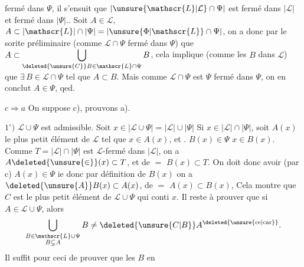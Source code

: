 fermé dans $\Psi$, il s'ensuit que $\lvert\unsure{\mathscr{L}|\mathcal{L}}\cap\Psi\rvert$ est fermé dans $\lvert\mathscr{L}\rvert$ et fermé dans $\lvert\Psi\rvert$.. Soit $A\in\mathscr{L}$, $A\subset\lvert\mathscr{L}\rvert\cap\lvert\Psi\rvert=\lvert\unsure{\Phi|\mathscr{L}}\cap\Psi\rvert$, on a donc par le sorite préliminaire (comme $\mathscr{L}\cap\Psi$ fermé dans $\Psi$) que $A\subset\displaystyle\bigcup_{\deleted{\unsure{C}}B\in\mathscr{L}\cap\Psi}B$, cela implique  (comme les $B$ dans $\mathscr{L}$) que $\exists\,B\in\mathscr{L}\cap\Psi$ tel que $A\subset B$.
 Mais comme $\mathscr{L}\cap\Psi$ est $\Psi$ fermé dans $\Psi$, on en conclut $A\in\Psi$, qed.

$c\Longrightarrow a$ \quad On suppose c), prouvons a).

$1^\circ)$ $\mathscr{L}\cup\Psi$ est admissible. Soit $x\in\lvert\mathscr{L}\cup\Psi\rvert=\lvert\mathscr{L}\rvert\cup\lvert\Psi\rvert$  Si $x\in\lvert\mathscr{L}\rvert\cap\lvert\Psi\rvert$, soit $A(x)$ le plus petit élément de $\mathscr{L}$ tel que $x\in A(x)$, et . $B(x)\in\Psi$  $x\in B(x)$. Comme $T=\lvert\mathscr{L}\rvert\cap\lvert\Psi\rvert$ est $\mathscr{L}$-fermé dans $\lvert\mathscr{L}\rvert$, on a $A\deleted{\unsure{\in}}(x)\subset T$, et de $=$ $B(x)\subset T$. On doit donc avoir (par c) $A(x)\in\Psi$ ie  donc par définition de $B(x)$ on a $\deleted{\unsure{A}}B(x)\subset A(x)$, de $=$ $A(x)\subset B(x)$, 
  Cela montre que $C$ est le plus petit élément de $\mathscr{L}\cup\Psi$ qui conti $x$. Il reste à prouver que si $A\in\mathscr{L}\cup\Psi$, alors  \[
 \bigcup_{\substack{B\in\mathscr{L}\cup\Psi\\B\subsetneq A}}B
 \ne\deleted{\unsure{C|B}}A^{\text{\deleted{\unsure{ce|car}}}} .
\]  Il  suffit pour ceci de prouver que  les $B$ en
